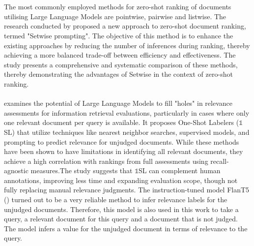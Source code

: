 \\\\
The most commonly employed methods for zero-shot ranking of documents utilising Large Language Models are pointwise, pairwise and listwise. The research conducted by \citet{zhuang:2024} proposed a new approach to zero-shot document ranking, termed "Setwise prompting". The objective of this method is to enhance the existing approaches by reducing the number of inferences during ranking, thereby achieving a more balanced trade-off between efficiency and effectiveness. The study presents a comprehensive and systematic comparison of these methods, thereby demonstrating the advantages of Setwise in the context of zero-shot ranking.
\\\\
\cite{macavaney:2023} examines the potential of Large Language Models to fill "holes" in relevance assessments for information retrieval evaluations, particularly in cases where only one relevant document per query is available. It proposes One-Shot Labelers ($\mathbb{1}$SL) that utilize techniques like nearest neighbor searches, supervised models, and prompting to predict relevance for unjudged documents. While these methods have been shown to have limitations in identifying all relevant documents, they achieve a high correlation with rankings from full assessments using recall-agnostic measures.The study suggests that $\mathbb{1}$SL can complement human annotations, improving less time and expanding evaluation scope, though not fully replacing manual relevance judgments. The instruction-tuned model FlanT5 (\citet{chung:2022}) turned out to be a very reliable method to infer relevance labels for the unjudged documents. Therefore, this model is also used in this work to take a query, a relevant document for this query and a document that is not judged. The model infers a value for the unjudged document in terms of relevance to the query.
